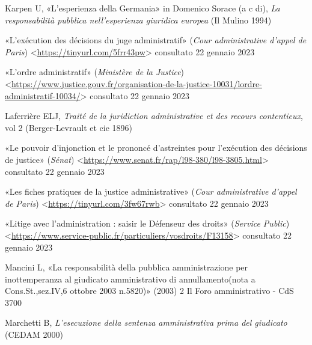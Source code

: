 \documentclass[12pt,it,a4paper,]{report}
\newlength{\cslhangindent}
\newenvironment{CSLReferences}[2] %
 {%
  \setlength{\parindent}{0pt}
  \ifodd #1 \everypar{\setlength{\hangindent}{\cslhangindent}}\ignorespaces\fi
  \ifnum #2 > 0
  \setlength{\parskip}{#2\baselineskip}
  \fi
 }%
 {}
\begin{document}
\begin{CSLReferences}{0}{0}
\leavevmode{}%
Karpen U, {«L'esperienza della Germania»} in Domenico Sorace (a c di),
\emph{La responsabilità pubblica nell'esperienza giuridica europea} (Il
Mulino 1994)

\leavevmode{}%
{«L'exécution des décisions du juge administratif»} (\emph{Cour
administrative d'appel de Paris})
\textless{}\url{https://tinyurl.com/5frr43pw}\textgreater{} consultato
22 gennaio 2023

\leavevmode{}%
{«L'ordre administratif»} (\emph{Ministère de la Justice})
\textless{}\url{https://www.justice.gouv.fr/organisation-de-la-justice-10031/lordre-administratif-10034/}\textgreater{}
consultato 22 gennaio 2023

\leavevmode{}%
Laferrière ELJ, \emph{Traité de la juridiction administrative et des
recours contentieux}, vol 2 (Berger-Levrault et cie 1896)

\leavevmode{}%
{«Le pouvoir d'injonction et le prononcé d'astreintes pour l'exécution
des décisions de justice»} (\emph{Sénat})
\textless{}\url{https://www.senat.fr/rap/l98-380/l98-3805.html}\textgreater{}
consultato 22 gennaio 2023

\leavevmode{}%
{«Les fiches pratiques de la justice administrative»} (\emph{Cour
administrative d'appel de Paris})
\textless{}\url{https://tinyurl.com/3fw67rwb}\textgreater{} consultato
22 gennaio 2023

\leavevmode{}%
{«Litige avec l'administration : saisir le Défenseur des droits»}
(\emph{Service Public})
\textless{}\url{https://www.service-public.fr/particuliers/vosdroits/F13158}\textgreater{}
consultato 22 gennaio 2023

\leavevmode{}%
Mancini L, {«La responsabilità della pubblica amministrazione per
inottemperanza al giudicato amministrativo di annullamento(nota a
Cons.St.,sez.IV,6 ottobre 2003 n.5820)»} (2003) 2 Il Foro amministrativo
- CdS 3700

\leavevmode{}%
Marchetti B, \emph{L'esecuzione della sentenza amministrativa prima del
giudicato} (CEDAM 2000)


\end{CSLReferences}
\end{document}
